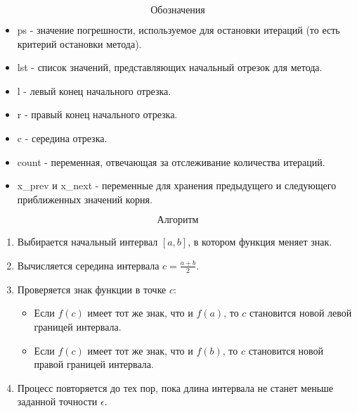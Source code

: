 \documentclass{article}
\begin{document}
$$\textbf{Обозначения}$$
\begin{itemize}
    \item ps - значение погрешности, используемое для остановки итераций (то есть критерий остановки метода).
    \item lst - список значений, представляющих начальный отрезок для метода.
    \item l - левый конец начального отрезка.
    \item r - правый конец начального отрезка.
    \item c - середина отрезка.
    \item count - переменная, отвечающая за отслеживание количества итераций.
    \item x\_prev и x\_next - переменные для хранения предыдущего и следующего приближенных значений корня.
\end{itemize}

$$\textbf{Алгоритм}$$

\begin{enumerate}
    \item Выбирается начальный интервал \([a, b]\), в котором функция меняет знак.
    \item Вычисляется середина интервала \( c = \frac{a + b}{2} \).
    \item Проверяется знак функции в точке \( c \):
    \begin{itemize}
        \item Если \( f(c) \) имеет тот же знак, что и \( f(a) \), то \( c \) становится новой левой границей интервала.
        \item Если \( f(c) \) имеет тот же знак, что и \( f(b) \), то \( c \) становится новой правой границей интервала.
    \end{itemize}
    \item Процесс повторяется до тех пор, пока длина интервала не станет меньше заданной точности \( \epsilon \).
\end{enumerate}
\end{document}
